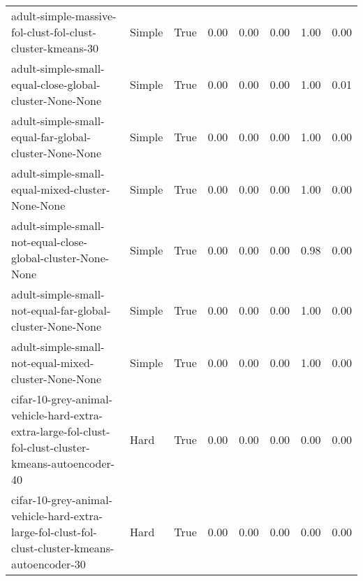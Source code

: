 \begin{longtable}{llllllll}
                                                   adult-simple-massive-fol-clust-fol-clust-cluster-kmeans-30 &       Simple &        True &                 0.00 &                 0.00 &                         0.00 &                         1.00 &                         0.00 \\
                                                      adult-simple-small-equal-close-global-cluster-None-None &       Simple &        True &                 0.00 &                 0.00 &                         0.00 &                         1.00 &                         0.01 \\
                                                        adult-simple-small-equal-far-global-cluster-None-None &       Simple &        True &                 0.00 &                 0.00 &                         0.00 &                         1.00 &                         0.00 \\
                                                             adult-simple-small-equal-mixed-cluster-None-None &       Simple &        True &                 0.00 &                 0.00 &                         0.00 &                         1.00 &                         0.00 \\
                                                  adult-simple-small-not-equal-close-global-cluster-None-None &       Simple &        True &                 0.00 &                 0.00 &                         0.00 &                         0.98 &                         0.00 \\
                                                    adult-simple-small-not-equal-far-global-cluster-None-None &       Simple &        True &                 0.00 &                 0.00 &                         0.00 &                         1.00 &                         0.00 \\
                                                         adult-simple-small-not-equal-mixed-cluster-None-None &       Simple &        True &                 0.00 &                 0.00 &                         0.00 &                         1.00 &                         0.00 \\
        cifar-10-grey-animal-vehicle-hard-extra-extra-large-fol-clust-fol-clust-cluster-kmeans-autoencoder-40 &         Hard &        True &                 0.00 &                 0.00 &                         0.00 &                         0.00 &                         0.00 \\
              cifar-10-grey-animal-vehicle-hard-extra-large-fol-clust-fol-clust-cluster-kmeans-autoencoder-30 &         Hard &        True &                 0.00 &                 0.00 &                         0.00 &                         0.00 &                         0.00 \\

\end{longtable}
